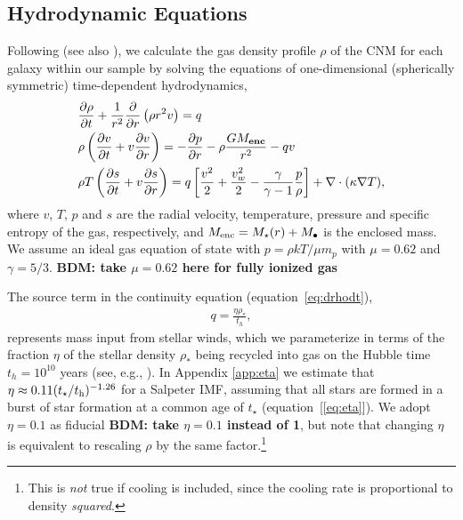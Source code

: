 \documentclass[usenatbib,fleqn]{mn2e}
\newcommand{\dxdy}[2]{\frac{\partial #1}{\partial #2} }
\newcommand{\drhodt}{\dxdy{\rho}{t}}
\newcommand{\dpdr}{\dxdy{p}{r}}
\newcommand{\ke}{\frac{v^2}{2}}
\newcommand{\kew}{\frac{v_w^2}{2}}
\newcommand{\gammaf}{\frac{\gamma}{\gamma-1}}
\newcommand{\cs}{\frac{p}{\rho}}
\newcommand{\rhostar}{\rho_*}
\newcommand{\Mbh}[1][]{M_{\bullet#1}}
\renewcommand{\th}{t_h}
\begin{document}


\subsection{Hydrodynamic Equations}
\label{sec:hydro}

Following \citet{Quataert:2004a} (see also \citealt{HolzerAxford:1970a,De-ColleGuillochon+:2012a,ShcherbakovWong+:2014a}), we calculate the gas density profile $\rho$ of the CNM for each galaxy within our sample by solving the equations of one-dimensional (spherically symmetric) time-dependent hydrodynamics,
\begin{align}
  &\drhodt+\frac{1}{r^2}\frac{\partial}{\partial r}\left(\rho r^2 v\right)=q \label{eq:drhodt}\\
  &\rho \left(\frac{\partial v}{\partial t} + v\frac{\partial v}{\partial r}\right) =-\dpdr- \rho\frac{GM_{\bf enc}}{r^{2}} -q v \label{eq:dvdt}\\
  &\rho T\left(\frac{\partial s}{\partial t} + v\frac{\partial
      s}{\partial r}\right)=q\left[\ke+\kew-\gammaf \cs \right] +\nabla\cdot(\kappa \nabla T)
, 
\label{eq:dsdt}
\end{align}
where $v$, $T$, $p$ and $s$ are the radial velocity, temperature,
pressure and specific entropy of the gas, respectively, and $M_{\rm enc} = M_{\star}(r) + \Mbh$ is the
enclosed mass.  We assume an ideal gas equation of state with $p =
\rho kT/\mu m_p$ with $\mu = 0.62$  and $\gamma = 5/3$. {\bf BDM: take $\mu = 0.62$ here for fully ionized gas}

The source term in the continuity equation (equation~\ref{eq:drhodt}),
\begin{align}
  q=\frac{\eta \rhostar}{\th},
\label{eq:q}
\end{align}
represents mass input from stellar winds, which we parameterize in
terms of the fraction $\eta$ of the stellar density $\rhostar$ being
recycled into gas on the Hubble time $\th = 10^{10}$ years (see, e.g.,
\citealt{Ciotti+91}).  In Appendix \ref{app:eta} we estimate that
$\eta \approx 0.11(t_{\star}/t_{\rm h})^{-1.26}$ for a Salpeter IMF,
assuming that all stars are formed in a burst of star formation at a
common age of $t_{\star}$ (equation~[\ref{eq:eta}]).  We adopt
$\eta=0.1$ as fiducial {\bf BDM: take $\eta = 0.1$ instead of 1}, but note that changing $\eta$ is equivalent to
rescaling $\rho$ by the same factor.\footnote{This is {\it not} true
  if cooling is included, since the cooling rate is proportional to
  density {\it squared}.}
\end{document}
